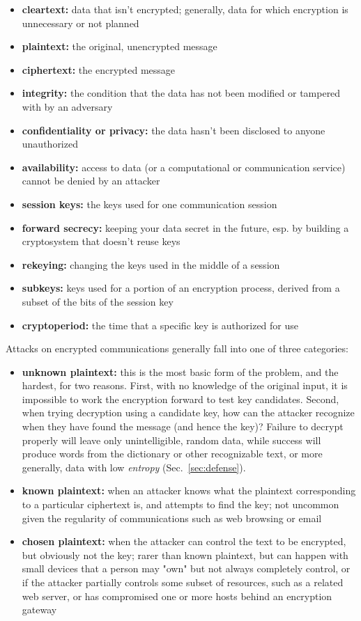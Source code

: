 \begin{itemize}
\item {\bf cleartext:} data that isn't encrypted; generally, data for
  which encryption is unnecessary or not planned
\item {\bf plaintext:} the original, unencrypted message
\item {\bf ciphertext:} the encrypted message
\item {\bf integrity:} the condition that the data has not been
  modified or tampered with by an adversary
\item {\bf confidentiality or privacy:} the data hasn't been disclosed to anyone unauthorized
\item {\bf availability:} access to data (or a computational or
  communication service) cannot be denied by an attacker
\item {\bf session keys:} the keys used for one communication session
\item {\bf forward secrecy:} keeping your data secret in the future, esp. by
  building a cryptosystem that doesn't reuse keys
\item {\bf rekeying:} changing the keys used in the middle of a session
\item {\bf subkeys:} keys used for a portion of an encryption process, derived
  from a subset of the bits of the session key
\item {\bf cryptoperiod:} the time that a specific key is authorized for use
\end{itemize}

Attacks on encrypted communications generally fall into one of three
categories:

\begin{itemize}
\item {\bf unknown plaintext:} this is the most basic form of the
  problem, and the hardest, for two reasons.  First, with no knowledge
  of the original input, it is impossible to work the encryption
  forward to test key candidates.  Second, when trying decryption
  using a candidate key, how can the attacker recognize when they have
  found the message (and hence the key)?  Failure to decrypt properly
  will leave only unintelligible, random data, while success will
  produce words from the dictionary or other recognizable text, or
  more generally, data with low \emph{entropy} (Sec.~\ref{sec:defense}).
\item {\bf known plaintext:} when an attacker knows what the plaintext
  corresponding to a particular ciphertext is, and attempts to find
  the key; not uncommon given the regularity of communications such as
  web browsing or email
\item {\bf chosen plaintext:} when the attacker can control the text to be
  encrypted, but obviously not the key; rarer than known plaintext,
  but can happen with small devices that a person may "own" but not
  always completely control, or if the attacker partially controls
  some subset of resources, such as a related web server, or has
  compromised one or more hosts behind an encryption gateway
\end{itemize}

